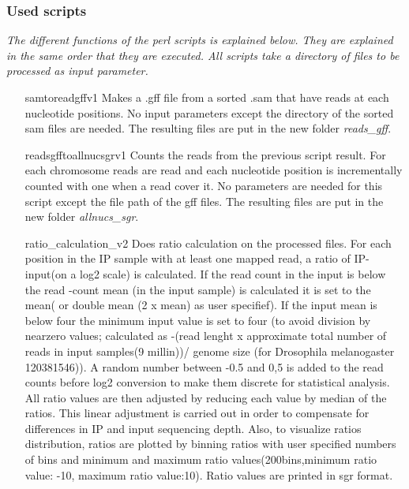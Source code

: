 \subsubsection{Used scripts}
\emph{The different functions of the perl scripts is explained below. They are explained in the same order that they are executed. All scripts take a directory of files to be processed as input parameter.}

\begin{itemize}
\item[samtoreadgffv1] Makes a .gff file from a sorted .sam that have reads at each nucleotide positions. No input parameters except the directory of the sorted sam files are needed. The resulting files are put in the new folder \textit{reads\_gff}.

\item[readsgfftoallnucsgrv1]  Counts the reads from the previous script result. For each chromosome reads are read and each nucleotide position is incrementally counted with one when a read cover it. No parameters are needed for this script except the file path of the gff files. The resulting files are put in the new folder \textit{allnucs\_sgr}.

\item[ratio\_calculation\_v2] Does ratio calculation on the processed files. For each position in the IP sample with at least one mapped read, a ratio of IP-input(on a log2 scale) is calculated. If the read count in the input is below the read -count mean (in the input sample) is calculated it is set to the mean( or double mean (2 x mean) as user specifief). If the input mean is below four the minimum input value is set to four (to avoid division by nearzero values; calculated as -(read lenght x approximate total number of reads in input samples(9 millin))/ genome size (for Drosophila melanogaster 120381546)). A random number between -0.5 and 0,5 is added to the read counts before log2 conversion to make them discrete for statistical analysis. All ratio values are then adjusted by reducing each value by median of the ratios. This linear adjustment is carried out in order to compensate for differences in IP and input sequencing depth. Also, to visualize ratios distribution, ratios are plotted by binning ratios with user specified numbers of bins and minimum and maximum ratio values(200bins,minimum ratio value: -10, maximum ratio value:10). Ratio values are printed in sgr format.
 

\end{itemize}

